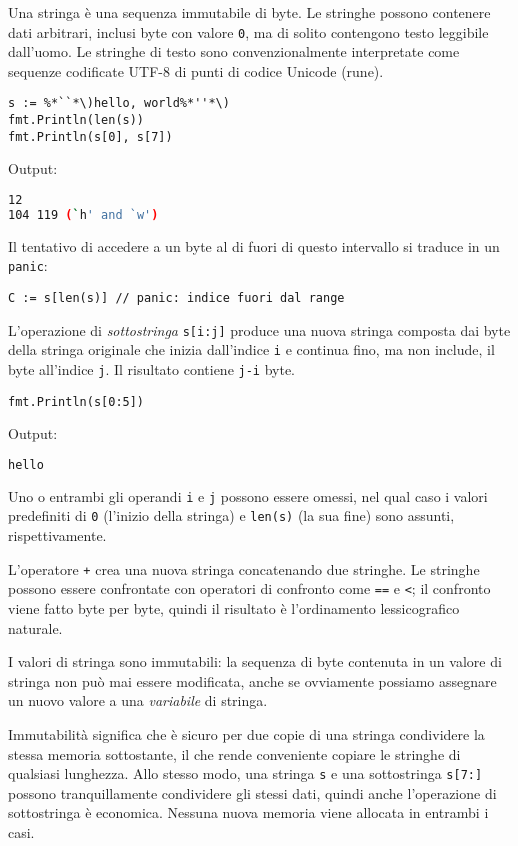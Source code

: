 %
Una stringa è una sequenza immutabile di byte.
Le stringhe possono contenere dati arbitrari, inclusi byte con valore \verb|0|, ma di solito contengono testo leggibile dall'uomo.
Le stringhe di testo sono convenzionalmente interpretate come sequenze codificate UTF-8 di punti di codice Unicode (rune).
\begin{lstlisting}[frame = single, label = {lst:lstlisting2.1}]
s := %*``*\)hello, world%*''*\)
fmt.Println(len(s))
fmt.Println(s[0], s[7])
\end{lstlisting}
Output:
\begin{lstlisting}[language = bash, frame = L, label = {lst:lstlisting2.2}]
12
104 119 (`h' and `w')
\end{lstlisting}
Il tentativo di accedere a un byte al di fuori di questo intervallo si traduce in un \verb|panic|:
\begin{lstlisting}[frame = single, label = {lst:lstlisting2.3}]
C := s[len(s)] // panic: indice fuori dal range
\end{lstlisting}
L'operazione di \textit{sottostringa} \verb|s[i:j]| produce una nuova stringa composta dai byte della stringa originale che inizia dall'indice \verb|i| e continua fino, ma non include, il byte all'indice \verb|j|.
Il risultato contiene \verb|j-i| byte.
\begin{lstlisting}[frame = single, label = {lst:lstlisting2.4}]
fmt.Println(s[0:5])
\end{lstlisting}
Output:
\begin{lstlisting}[language = bash, frame = L, label = {lst:lstlisting2-2.5}]
hello
\end{lstlisting}
Uno o entrambi gli operandi \verb|i| e \verb|j| possono essere omessi, nel qual caso i valori predefiniti di \verb|0| (l'inizio della stringa) e \verb|len(s)| (la sua fine) sono assunti, rispettivamente.

L'operatore \verb|+| crea una nuova stringa concatenando due stringhe.
Le stringhe possono essere confrontate con operatori di confronto come \verb|==| e \verb|<|;
il confronto viene fatto byte per byte, quindi il risultato è l'ordinamento lessicografico naturale.

I valori di stringa sono immutabili: la sequenza di byte contenuta in un valore di stringa non può mai essere modificata, anche se ovviamente possiamo assegnare un nuovo valore a una \textit{variabile} di stringa.

Immutabilità significa che è sicuro per due copie di una stringa condividere la stessa memoria sottostante, il che rende conveniente copiare le stringhe di qualsiasi lunghezza.
Allo stesso modo, una stringa \verb|s| e una sottostringa \verb|s[7:]| possono tranquillamente condividere gli stessi dati, quindi anche l'operazione di sottostringa è economica.
Nessuna nuova memoria viene allocata in entrambi i casi.

